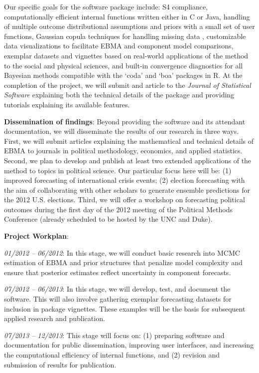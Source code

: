 \documentclass[pdftex,12pt,fullpage,oneside]{amsart}
\begin{document}
Our specific goals for the software package include: S4 compliance,
computationally efficient internal functions written either in C or
Java, handling of multiple outcome distributional assumptions and
priors with a small set of user functions, Gaussian copula techniques
for handling missing data \citep{Hoff:2007}, customizable data
visualizations to facilitate EBMA and component model comparisons,
exemplar datasets and vignettes based on real-world
applications of the method to the social and physical sciences, and
built-in convergence diagnostics for all Bayesian methods compatible
with the `coda' and `boa' packages in R.  At the completion of the
project, we will submit and article to the \textit{Journal of
  Statistical Software} explaining both the technical details of the
package and providing tutorials explaining its available features.

\textbf{Dissemination of findings}: Beyond providing the software and
its attendant documentation, we will disseminate the results of our
research in three ways.  First, we will submit articles explaining the
mathematical and technical details of EBMA to journals in political
methodology, economics, and applied statistics.  Second, we plan to
develop and publish at least two extended applications of the method
to topics in political science.  Our particular focus here will be:
(1) improved forecasting of international crisis events; (2) election
forecasting with the aim of collaborating with other scholars to
generate ensemble predictions for the 2012 U.S. elections.  Third, we
will offer a workshop on forecasting political outcomes during the
first day of the 2012 meeting of the Political Methods Conference
(already scheduled to be hosted by the UNC and Duke).

\textbf{Project Workplan}:

\noindent \textit{01/2012 -- 06/2012}: In this stage, we will conduct basic
research into MCMC estimation of EBMA and prior structures that
penalize model complexity and ensure that posterior estimates reflect
uncertainty in component forecasts.

\noindent \textit{07/2012 -- 06/2013}: In this stage, we will develop,
test, and document the software. This will also involve gathering
exemplar forecasting datasets for inclusion in package vignettes.
These examples will be the basis for subsequent applied research and
publication.

\noindent \textit{07/2013 -- 12/2013}: This stage will focus on: (1)
preparing software and documentation for public dissemination,
improving user interfaces, and increasing the computational efficiency
of internal functions, and (2) revision and submission of results for
publication.
\end{document}
